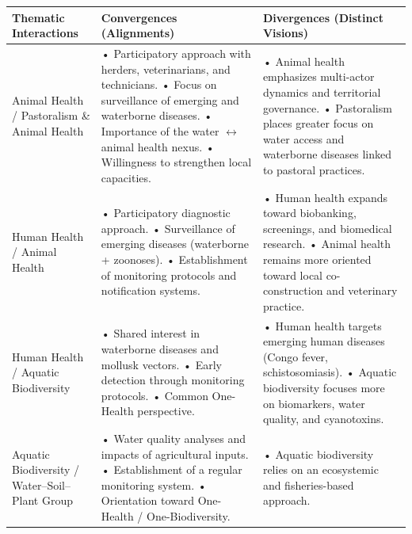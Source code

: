 \documentclass{article}
\begin{document}
\begin{table}[h!]
\centering
\footnotesize
\begin{tabularx}{\textwidth}{>{\raggedright\arraybackslash}p{3.2cm} X X}
\hline
\textbf{Thematic Interactions} & \textbf{Convergences (Alignments)} & \textbf{Divergences (Distinct Visions)} \\
\hline
Animal Health / Pastoralism \& Animal Health 
& • Participatory approach with herders, veterinarians, and technicians. \newline 
• Focus on surveillance of emerging and waterborne diseases. \newline
• Importance of the water $\leftrightarrow$ animal health nexus. \newline
• Willingness to strengthen local capacities. 
& • Animal health emphasizes multi-actor dynamics and territorial governance. \newline
• Pastoralism places greater focus on water access and waterborne diseases linked to pastoral practices. \\
\hline
Human Health / Animal Health 
& • Participatory diagnostic approach. \newline
• Surveillance of emerging diseases (waterborne + zoonoses). \newline
• Establishment of monitoring protocols and notification systems.
& • Human health expands toward biobanking, screenings, and biomedical research. \newline
• Animal health remains more oriented toward local co-construction and veterinary practice. \\
\hline
Human Health / Aquatic Biodiversity 
& • Shared interest in waterborne diseases and mollusk vectors. \newline
• Early detection through monitoring protocols. \newline
• Common One-Health perspective.
& • Human health targets emerging human diseases (Congo fever, schistosomiasis). \newline
• Aquatic biodiversity focuses more on biomarkers, water quality, and cyanotoxins. \\
\hline
Aquatic Biodiversity / Water–Soil–Plant Group
& • Water quality analyses and impacts of agricultural inputs. \newline
• Establishment of a regular monitoring system. \newline
• Orientation toward One-Health / One-Biodiversity.
& • Aquatic biodiversity relies on an ecosystemic and fisheries-based approach. \newline

\end{tabularx}
\end{table}
\end{document}
